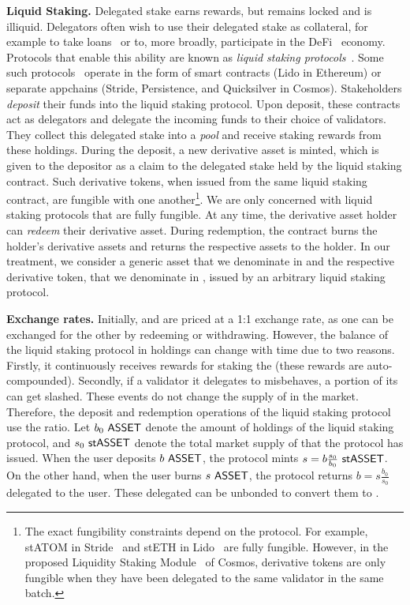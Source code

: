 \noindent
\textbf{Liquid Staking.} Delegated stake earns rewards, but remains locked and
is illiquid. Delegators often wish to use their delegated stake as collateral,
for example to take loans~\cite{gudgeon2020defi} or to, more broadly, participate in the
DeFi~\cite{defi-sok} economy. Protocols that enable this ability are known as
\emph{liquid staking protocols}~\cite{liquid-staking-report}.
Some such protocols~\cite{lido,stride} operate
in the form of smart contracts (\eg Lido in Ethereum) or separate appchains
(\eg Stride, Persistence, and Quicksilver in Cosmos).
Stakeholders \emph{deposit} their funds into the liquid staking protocol.
Upon deposit, these contracts act as
delegators and delegate the incoming funds to their choice of validators.
They collect this delegated stake into a \emph{pool} and receive staking
rewards from these holdings.
During the deposit, a new derivative asset is minted,
which is given to the depositor as a claim to the delegated stake held by the
liquid staking contract. Such derivative tokens, when issued from the same liquid
staking contract, are fungible with one another\footnote{The exact fungibility
constraints depend on the protocol. For example,
\textsf{stATOM} in Stride~\cite{stride} and \textsf{stETH} in Lido~\cite{lido} are fully fungible.
However, in the proposed Liquidity Staking
Module~\cite{liquidity-staking-module} of Cosmos,
derivative tokens are only fungible when they have been
delegated to the same validator in the same batch.}. We are only concerned with liquid
staking protocols that are fully fungible. At any time, the derivative asset holder
can \emph{redeem} their derivative asset.
During redemption, the contract burns
the holder's derivative assets and returns the respective assets to the holder.
In our treatment, we consider a generic asset that we denominate in \asset
and the respective derivative token, that we denominate in \stasset,
issued by an arbitrary liquid staking protocol.

\noindent
\textbf{Exchange rates.} Initially, \asset and \stasset are priced at a 1:1 exchange rate,
as one can be exchanged for the other by redeeming or withdrawing. However, the balance
of the liquid staking protocol in \asset holdings can change with time due to two reasons.
Firstly, it continuously receives rewards for staking the \asset (these rewards are
auto-compounded). Secondly, if a validator it delegates to misbehaves, a portion of its
\asset can get slashed. These events do not change the supply of \stasset in the market.
Therefore, the deposit and redemption operations of the liquid staking protocol use
the ratio. Let $b_0 ~\text{\textsf{ASSET}}$ denote the amount of \asset holdings of the liquid staking
protocol, and $s_0 ~\text{\textsf{stASSET}}$ denote the total market supply of \stasset that the protocol
has issued. When the user deposits $b ~\text{\textsf{ASSET}}$, the protocol mints $s = b \frac{s_0}{b_0} ~\text{\textsf{stASSET}}$.
On the other hand, when the user burns $s ~\text{\textsf{ASSET}}$, the protocol returns $b = s \frac{b_0}{s_0}$
delegated \asset to the user. These delegated \asset can be unbonded to convert them
to \asset.

